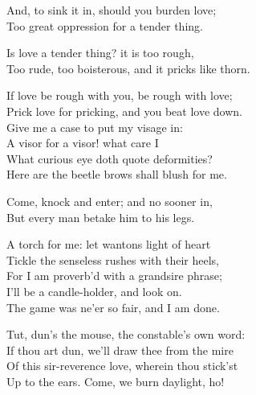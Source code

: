 \begin{speech}
And, to sink it in, should you burden love; \\
Too great oppression for a tender thing. \\
\end{speech}
\begin{speech}
Is love a tender thing? it is too rough, \\
Too rude, too boisterous, and it pricks like thorn. \\
\end{speech}
\begin{speech}
If love be rough with you, be rough with love; \\

Prick love for pricking, and you beat love down. \\
Give me a case to put my visage in: \\
A visor for a visor! what care I \\
What curious eye doth quote deformities? \\
Here are the beetle brows shall blush for me. \\
\end{speech}
\begin{speech}
Come, knock and enter; and no sooner in, \\
But every man betake him to his legs. \\
\end{speech}
\begin{speech}
A torch for me: let wantons light of heart \\
Tickle the senseless rushes with their heels, \\
For I am proverb'd with a grandsire phrase; \\
I'll be a candle-holder, and look on. \\
The game was ne'er so fair, and I am done. \\
\end{speech}
\begin{speech}
Tut, dun's the mouse, the constable's own word: \\

If thou art dun, we'll draw thee from the mire \\
Of this sir-reverence love, wherein thou stick'st \\
Up to the ears. Come, we burn daylight, ho! \\
\end{speech}
